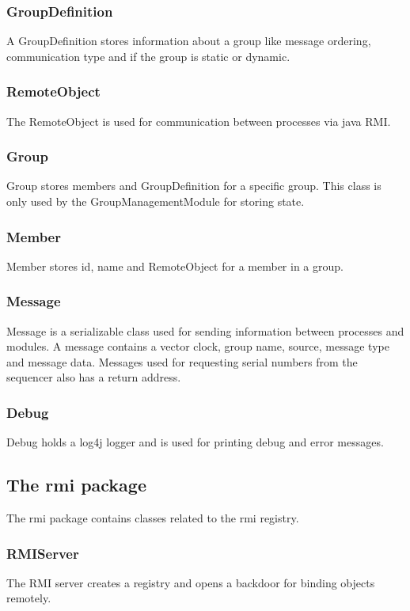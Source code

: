 \documentclass[english]{article}
\begin{document}
\subsubsection{GroupDefinition}
A GroupDefinition stores information about a group like message ordering, communication type and if the group is static or dynamic. 

\subsubsection{RemoteObject}
The RemoteObject is used for communication between processes via java RMI. 

\subsubsection{Group}
Group stores members and GroupDefinition for a specific group. This class is only used by the GroupManagementModule for storing state.

\subsubsection{Member}
Member stores id, name and RemoteObject for a member in a group.

\subsubsection{Message}
Message is a serializable class used for sending information between processes and modules. A message contains a vector clock, group name, source, message type and message data. Messages used for requesting serial numbers from the sequencer also has a return address.

\subsubsection{Debug}
Debug holds a log4j logger and is used for printing debug and error messages.

\subsection{The rmi package}
The rmi package contains classes related to the rmi registry. 

\subsubsection{RMIServer}
The RMI server creates a registry and opens a backdoor for binding objects remotely.
\end{document}
